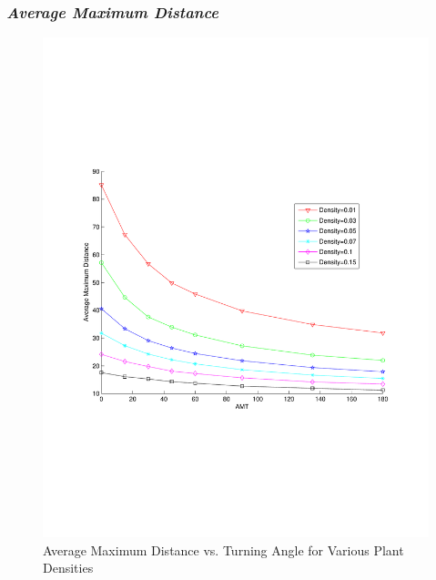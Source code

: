 \documentclass[preprint,12pt]{elsarticle}
\numberwithin{equation}{subsection}
\begin{document}
\subsubsection*{\emph{Average Maximum Distance}}
\begin{figure}
  \begin{center}
  \includegraphics[width=1.0\textwidth]{MaxDVsAMT.pdf}
  \end{center}
  \caption{\small Average Maximum Distance vs. Turning Angle for Various Plant
Densities}
  \label{AvgMaxDBees}
\end{figure}
\end{document}
